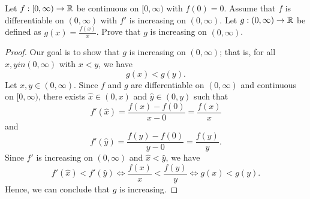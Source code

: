 \documentclass[a4paper]{article}
\begin{document}
\begin{problem}
    Let \( f: [0,\infty ) \to \mathbb{R}   \) be continuous on \( [0,\infty ) \) with \( f(0) = 0 \). Assume that \( f  \) is differentiable on \( (0,\infty  ) \) with \( f'  \) is increasing on \( (0,\infty ) \). Let \( g : (0,\infty  ) \to \mathbb{R}  \) be defined as \( g(x) = \frac{ f(x) }{ x  }  \). Prove that \( g  \) is increasing on \( (0,\infty ) \).
\end{problem}
\begin{proof}
Our goal is to show that \( g  \) is increasing on \( (0,\infty ) \); that is, for all \( x,y 
in (0,\infty )\) with \( x < y \), we have 
\[  g(x) < g(y). \]
Let \( x,y \in (0,\infty ) \). Since \( f  \) and \( g  \) are differentiable on \( (0,\infty ) \) and continuous on \( [0,\infty) \), there exists \( \hat{x} \in (0,x) \) and \( \hat{y} \in (0,y) \) such that  
\[  f'(\hat{x}) = \frac{ f(x) - f(0) }{  x - 0  } = \frac{ f(x)  }{ x  }   \]
and 
\[  f'(\hat{y}) = \frac{ f(y) - f(0) }{ y - 0  } = \frac{ f(y) }{ y }.  \]
Since \( f'  \) is increasing on \( (0,\infty ) \) and \( \hat{x} < \hat{y} \), we have 
\[  f'(\hat{x}) < f'(\hat{y}) \iff \frac{ f(x) }{ x  }  < \frac{ f(y) }{ y } \iff g(x) < g(y). \]
Hence, we can conclude that \( g  \) is increasing.
\end{proof}
\end{document}
